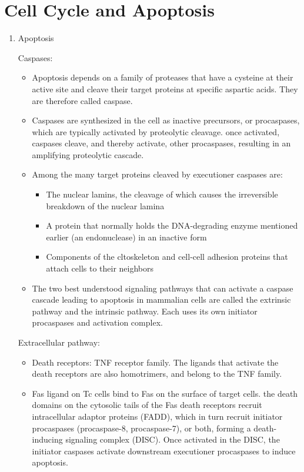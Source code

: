 \documentclass{report}
\begin{document}
\section{Cell Cycle and Apoptosis}
\begin{enumerate}

\item{Apoptosis}

Caspases:
\begin{itemize}
\item Apoptosis depends on a family of proteases that have a cysteine at their active site and cleave their target proteins at specific aspartic acids. They are therefore called caspase. 

\item Caspases are synthesized in the cell as inactive precursors, or procaspases, which are typically activated by proteolytic cleavage. once activated, caspases cleave, and thereby activate, other procaspases, resulting in an amplifying proteolytic cascade. 

\item Among the many target proteins cleaved by executioner caspases are: 
\begin{itemize}
	\item The nuclear lamins, the cleavage of which causes the irreversible breakdown of the nuclear lamina
	\item A protein that normally holds the DNA-degrading enzyme mentioned earlier (an endonuclease) in an inactive form 
	\item Components of the cltoskeleton and cell-cell adhesion proteins that attach cells to their neighbors
\end{itemize}

\item The two best understood signaling pathways that can activate a caspase cascade leading to apoptosis in mammalian cells are called the extrinsic pathway and the intrinsic pathway. Each uses its own initiator procaspases and activation complex. 
\end{itemize}

Extracellular pathway: 
\begin{itemize}
\item Death receptors: TNF receptor family. The ligands that activate the death receptors are also homotrimers, and belong to the TNF family. 

\item Fas ligand on Tc cells bind to Fas on the surface of target cells. the death domains on the cytosolic tails of the Fas death receptors recruit intracellular adaptor proteins (FADD), which in turn recruit initiator procaspases (procaspase-8, procaspase-7), or both, forming a death-inducing signaling complex (DISC). Once activated in the DISC, the initiator caspases activate downstream executioner procaspases to induce apoptosis. 


\end{itemize}
\end{enumerate}
\end{document}
